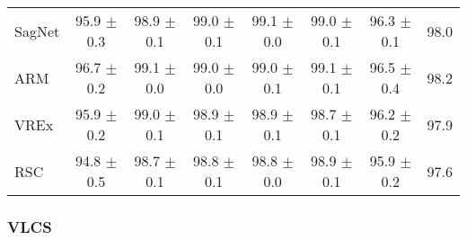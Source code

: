 \documentclass{article}
\begin{document}
\begin{center}
{\begin{tabular}{lccccccc}
SagNet               & 95.9 $\pm$ 0.3       & 98.9 $\pm$ 0.1       & 99.0 $\pm$ 0.1       & 99.1 $\pm$ 0.0       & 99.0 $\pm$ 0.1       & 96.3 $\pm$ 0.1       & 98.0                 \\
ARM                  & 96.7 $\pm$ 0.2       & 99.1 $\pm$ 0.0       & 99.0 $\pm$ 0.0       & 99.0 $\pm$ 0.1       & 99.1 $\pm$ 0.1       & 96.5 $\pm$ 0.4       & 98.2                 \\
VREx                 & 95.9 $\pm$ 0.2       & 99.0 $\pm$ 0.1       & 98.9 $\pm$ 0.1       & 98.9 $\pm$ 0.1       & 98.7 $\pm$ 0.1       & 96.2 $\pm$ 0.2       & 97.9                 \\
RSC                  & 94.8 $\pm$ 0.5       & 98.7 $\pm$ 0.1       & 98.8 $\pm$ 0.1       & 98.8 $\pm$ 0.0       & 98.9 $\pm$ 0.1       & 95.9 $\pm$ 0.2       & 97.6                 \\
\bottomrule
\end{tabular}}
\end{center}

\subsubsection{VLCS}
\end{document}
